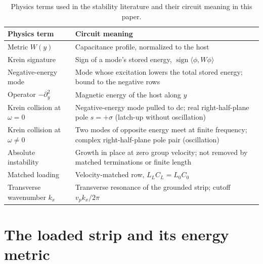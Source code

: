 \documentclass[aps,prapplied,twocolumn,superscriptaddress,floatfix,longbibliography]{revtex4-2}
\begin{document}
\begin{table}[t]
\caption{Physics terms used in the stability literature and their circuit meaning in this paper.}
\label{tab:dictionary}
\begin{ruledtabular}
\begin{tabular}{p{}p{}}
Physics term & Circuit meaning \\ \hline
Metric $W(y)$ & Capacitance profile, normalized to the host \\
Krein signature & Sign of a mode's stored energy, $\operatorname{sign}\langle\phi,W\phi\rangle$ \\
Negative-energy mode & Mode whose excitation lowers the total stored energy; bound to the negative rows \\
Operator $-\partial_y^2$ & Magnetic energy of the host along $y$ \\
Krein collision at $\omega=0$ & Negative-energy mode pulled to dc; real right-half-plane pole $s=+\sigma$ (latch-up without oscillation) \\
Krein collision at $\omega\neq0$ & Two modes of opposite energy meet at finite frequency; complex right-half-plane pole pair (oscillation) \\
Absolute instability & Growth in place at zero group velocity; not removed by matched terminations or finite length \\
Matched loading & Velocity-matched row, $L_LC_L=L_0C_0$ \\
Transverse wavenumber $k_x$ & Transverse resonance of the grounded strip; cutoff $v_pk_x/2\pi$ \\
\end{tabular}
\end{ruledtabular}
\end{table}

\section{The loaded strip and its energy metric}
\label{sec:model}
\end{document}
